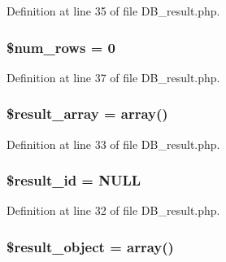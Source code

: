 Definition at line 35 of file D\-B\-\_\-result.\-php.

\hypertarget{class_c_i___d_b__result_ac926549b713e71c5f5fd63999cebfb8c}{
\subsubsection[{\$num\-\_\-rows}]{\setlength{\rightskip}{0pt plus 5cm}\${\bf num\-\_\-rows} = 0}}\label{class_c_i___d_b__result_ac926549b713e71c5f5fd63999cebfb8c}


Definition at line 37 of file D\-B\-\_\-result.\-php.

\hypertarget{class_c_i___d_b__result_a153392b3ec395131d32c70cda855698e}{
\subsubsection[{\$result\-\_\-array}]{\setlength{\rightskip}{0pt plus 5cm}\${\bf result\-\_\-array} = array()}}\label{class_c_i___d_b__result_a153392b3ec395131d32c70cda855698e}


Definition at line 33 of file D\-B\-\_\-result.\-php.

\hypertarget{class_c_i___d_b__result_a0ebacb40e3b6f8bf33d3de0f2cc71474}{
\subsubsection[{\$result\-\_\-id}]{\setlength{\rightskip}{0pt plus 5cm}\$result\-\_\-id = N\-U\-L\-L}}\label{class_c_i___d_b__result_a0ebacb40e3b6f8bf33d3de0f2cc71474}


Definition at line 32 of file D\-B\-\_\-result.\-php.

\hypertarget{class_c_i___d_b__result_aa292cbb3dbb8c654cb4f6c61f250efd3}{
\subsubsection[{\$result\-\_\-object}]{\setlength{\rightskip}{0pt plus 5cm}\${\bf result\-\_\-object} = array()}}\label{class_c_i___d_b__result_aa292cbb3dbb8c654cb4f6c61f250efd3}


